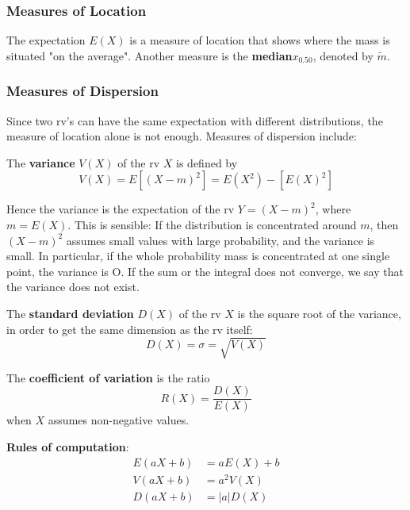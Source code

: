 \documentclass[a4paper,9pt]{extarticle}
\begin{document}
\begin{multicols*}{2}
\subsubsection{Measures of Location}
The expectation $E(X)$ is a measure of location that shows where the mass is situated "on the average". Another measure is the \textbf{median}$x_{0.50}$, denoted by $\widetilde{m}$.

\subsubsection{Measures of Dispersion}
Since two rv's can have the same expectation with different distributions, the measure of location alone is not enough. Measures of dispersion include:

The \textbf{variance} $V(X)$ of the rv $X$ is defined by
\begin{equation}
    V(X) = E[(X - m)^2] = E(X^2) - [E(X)^2]
\end{equation}

Hence the variance is the expectation of the rv $Y = (X - m)^2$, where $m = E(X)$. This is sensible: If the distribution is concentrated around $m$, then $(X - m)^2$ assumes small values with large probability, and the variance is small. In particular, if the whole probability mass is concentrated at one single point, the variance is O. If the sum or the integral does not converge, we say that the variance does not exist.

The \textbf{standard deviation} $D(X)$ of the rv $X$ is the square root of the variance, in order to get the same dimension as the rv itself:
\begin{equation}
    D(X) = \sigma = \sqrt{V(X)}
\end{equation}

The \textbf{coefficient of variation} is the ratio
\begin{equation}
    R(X) = \frac{D(X)}{E(X)}
\end{equation}
when $X$ assumes non-negative values.

\textbf{Rules of computation}:
\begin{equation}
    \begin{split}
        E(a X + b) & = a E(X) + b \\
        V(a X + b) & = a^2 V(X) \\
        D(a X + b) & = |a| D(X)
    \end{split}
\end{equation}


\end{multicols*}
\end{document}
